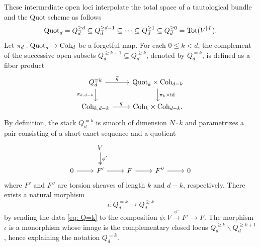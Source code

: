 \documentclass[10pt]{amsart}
\newcommand{\Tot}{\mathrm{Tot}}
\newcommand{\Quot}{\textnormal{Quot}}
\newcommand{\Coh}{\textnormal{Coh}}
\newcommand{\id}{\textnormal{id}}
\newcommand{\+}{{}^+}
\theoremstyle{definition}
\theoremstyle {definition}
\theoremstyle {definition}
\begin{document}
These intermediate open loci interpolate the total space of a tautological bundle and the Quot scheme as follows
$$\Quot_d=Q_d^{\geq d}\subseteq Q_d^{\geq d-1}\subseteq \cdots\subseteq Q_d^{\geq 1}\subseteq Q_d^{\geq 0}=\Tot(V^{[d]}). 
$$
Let $\pi_d:\Quot_d\rightarrow \Coh_d$ be a forgetful map. For each $0\leq k<d$, the complement of the successive open subsets $Q^{\geq k+1}_d\subseteq Q^{\geq k}_d$, denoted by $Q^{=k}_d$, is defined as a fiber product
\begin{equation*}
    \begin{tikzcd}
Q^{=k}_d \arrow[d, "\pi_{k, d-k}"'] \arrow[r, "\overline{q}"] & \Quot_k\times \Coh_{d-k} \arrow[d, "\pi_k\times \id"] \\
{\Coh_{k, d-k}} \arrow[r, "q"]    & \Coh_k\times \Coh_{d-k}.       
\end{tikzcd}
\end{equation*}
By definition, the stack $Q^{=k}_d$ is smooth of dimension $N\cdot k$ and parametrizes a pair consisting of a short exact sequence and a quotient
\begin{equation}\label{eq: Q=k}
    \begin{tikzcd}
            & V \arrow[d, two heads, "\phi'"] &             &               &   \\
0 \arrow[r] & F' \arrow[r]           & F \arrow[r] & F'' \arrow[r] & 0
\end{tikzcd}
\end{equation}
where $F'$ and $F''$ are torsion sheaves of length $k$ and $d-k$, respectively. There exists a natural morphism 
$$\iota:Q^{=k}_d\rightarrow Q_{d}^{\geq k}
$$
by sending the data \eqref{eq: Q=k} to the composition $\phi:V\xrightarrow{\phi'}F'\rightarrow F$. The morphism $\iota$ is a monorphism whose image is the complementary closed locus $Q_d^{\geq k}\backslash Q_d^{\geq k+1}$, hence explaining the notation $Q^{=k}_d$.
\end{document}
